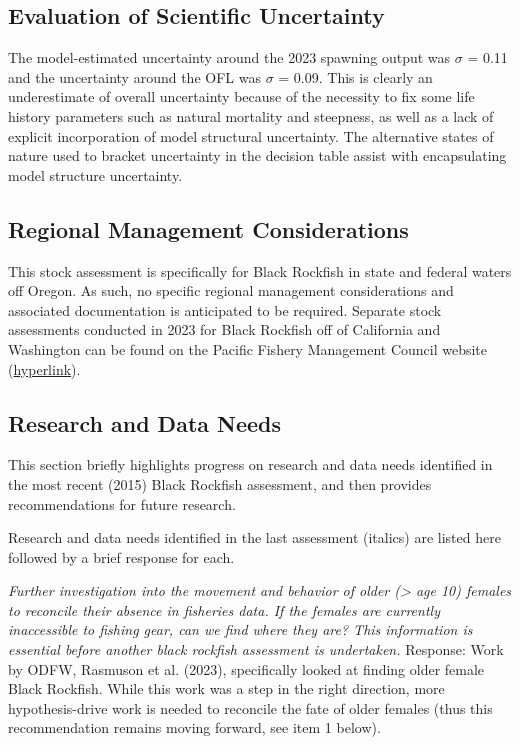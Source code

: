 \documentclass[11pt,
  english,
  letterpaper,
]{article}
\begin{document}
\hypertarget{evaluation-of-scientific-uncertainty}{%
\subsection{Evaluation of Scientific Uncertainty}\label{evaluation-of-scientific-uncertainty}}

The model-estimated uncertainty around the 2023 spawning output was \(\sigma\) = 0.11 and the uncertainty around the OFL was \(\sigma\) = 0.09. This is clearly an underestimate of overall uncertainty because of the necessity to fix some life history parameters such as natural mortality and steepness, as well as a lack of explicit incorporation of model structural uncertainty. The alternative states of nature used to bracket uncertainty in the decision table assist with encapsulating model structure uncertainty.

\hypertarget{regional-management-considerations}{%
\subsection{Regional Management Considerations}\label{regional-management-considerations}}

This stock assessment is specifically for Black Rockfish in state and federal waters off Oregon. As such, no specific regional management considerations and associated documentation is anticipated to be required. Separate stock assessments conducted in 2023 for Black Rockfish off of California and Washington can be found on the Pacific Fishery Management Council website (\href{https://www.pcouncil.org/stock-assessments-star-reports-stat-reports-rebuilding-analyses-terms-of-reference/groundfish-stock-assessment-documents/}{hyperlink}).

\hypertarget{research-and-data-needs-1}{%
\subsection{Research and Data Needs}\label{research-and-data-needs-1}}

This section briefly highlights progress on research and data needs identified in the most recent (2015) Black Rockfish assessment, and then provides recommendations for future research.

Research and data needs identified in the last assessment (italics) are listed here followed by a brief response for each.

\textit{Further investigation into the movement and behavior of older (> age 10) females to reconcile their absence in fisheries data. If the females are currently inaccessible to fishing gear, can we find where they are? This information is essential before another black rockfish assessment is undertaken.} Response: Work by ODFW, Rasmuson et al. (2023), specifically looked at finding older female Black Rockfish. While this work was a step in the right direction, more hypothesis-drive work is needed to reconcile the fate of older females (thus this recommendation remains moving forward, see item 1 below).
\end{document}
